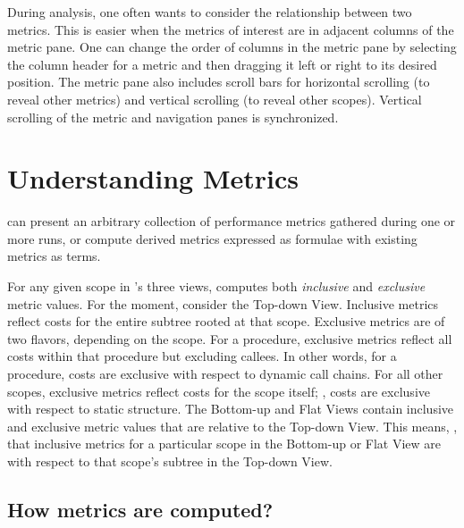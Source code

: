 During analysis, one often wants to consider the relationship between two metrics.
This is easier when the metrics of interest are in adjacent columns of the metric pane.
One can change the order of columns in the metric pane by selecting the column header for a metric and then dragging it left or right to its desired position.
The metric pane also includes scroll bars for horizontal scrolling (to reveal other metrics) and vertical scrolling (to reveal other scopes).
Vertical scrolling of the metric and navigation panes is synchronized.



\section{Understanding Metrics}

\hpcviewer{} can present an arbitrary collection of performance metrics gathered during one or more runs, or compute derived metrics expressed as formulae with existing metrics as terms.

For any given scope in \hpcviewer{}'s three views, \hpcviewer{} computes both \emph{inclusive} and \emph{exclusive} metric values.
For the moment, consider the Top-down View.
Inclusive metrics reflect costs for the entire subtree rooted at that scope.
Exclusive metrics are of two flavors, depending on the scope.
For a procedure, exclusive metrics reflect all costs within that procedure but excluding callees.
In other words, for a procedure, costs are exclusive with respect to dynamic call chains.
For all other scopes, exclusive metrics reflect costs for the scope itself; \ie{}, costs are exclusive with respect to static structure.
The Bottom-up and Flat Views contain inclusive and exclusive metric values that are relative to the Top-down View.
This means, \eg{}, that inclusive metrics for a particular scope in the Bottom-up or Flat View are with respect to that scope's subtree in the Top-down View.



\subsection{How metrics are computed?}


